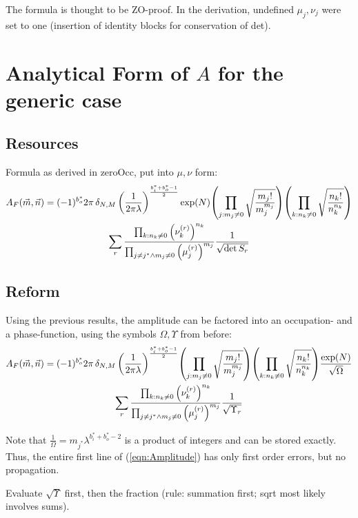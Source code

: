\documentclass[
	english,
	a4paper,
	fontsize=10pt,
	parskip=half,
	titlepage=true,
	DIV=12,
	final
]{scrreprt}
\begin{document}
The formula is thought to be ZO-proof. In the derivation, undefined $\mu_j, \nu_j$ were set to one (insertion of identity blocks for conservation of det).

\chapter{Analytical Form of $A$ for the generic case}
\section{Resources}
Formula as derived in zeroOcc, put into $\mu, \nu$ form:
\begin{multline}
	A_F(\vec{m}, \vec{n})
=
	(-1)^{b_o^*}
	2\pi \, \delta_{N,M} \, \qty(
		\frac{1}{2\pi\lambda}
	)^{\frac{b_i^* + b_o^* - 1}{2}}
	\exp(N)
	\qty( \prod_{j : m_j \neq 0}
		\sqrt{\frac
			{ m_j! }
			{ m_j^{m_j} }
	})
	\qty( \prod_{k : n_k \neq 0}
		\sqrt{\frac
			{ n_k! }
			{ n_k^{n_k} }
	})
\\
	\sum_r
		\frac
			{\prod_{k             : n_k \neq 0} \qty(\nu_k^{(r)})^{n_k}}
			{\prod_{j\neq j^* \land m_j \neq 0} \qty(\mu_j^{(r)})^{m_j}}
		\frac
			{1}
			{\sqrt{\det S_r}}
\end{multline}

\section{Reform}
Using the previous results, the amplitude can be factored into an occupation- and a phase-function, using the symbols $\Omega, \Upsilon$ from before:
\begin{multline}
	A_F(\vec{m}, \vec{n})
=
	(-1)^{b_o^*}
	2\pi \, \delta_{N,M} \, \qty(
		\frac{1}{2\pi\lambda}
	)^{\frac{b_i^* + b_o^* - 1}{2}}
	\qty( \prod_{j : m_j \neq 0}
		\sqrt{\frac
			{ m_j! }
			{ m_j^{m_j} }
	})
	\qty( \prod_{k : n_k \neq 0}
		\sqrt{\frac
			{ n_k! }
			{ n_k^{n_k} }
	})
	\frac
		{\exp(N)}
		{\sqrt{\Omega}}
\\
	\sum_r
		\frac
			{\prod_{k             : n_k \neq 0} \qty(\nu_k^{(r)})^{n_k}}
			{\prod_{j\neq j^* \land m_j \neq 0} \qty(\mu_j^{(r)})^{m_j}}
		\frac
			{1}
			{\sqrt{\Upsilon_r}}
\label{eqn:Amplitude}
\end{multline}

Note that $\frac{1}{\Omega} = m_{j^*} \lambda^{b_i^* + b_o^* - 2} $ is a product of integers and can be stored exactly. Thus, the entire first line of (\ref{eqn:Amplitude}) has only first order errors, but no propagation.

Evaluate $\sqrt{\Upsilon}$ first, then the fraction (rule: summation first; sqrt most likely involves sums).
\end{document}
